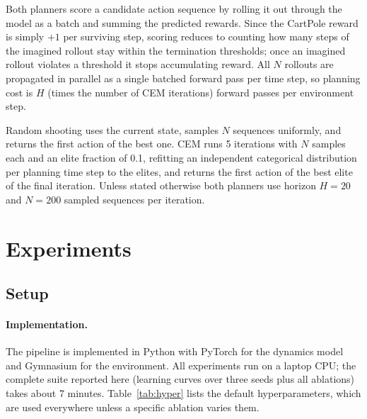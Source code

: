 \documentclass{article}
\begin{document}
Both planners score a candidate action sequence by rolling it out through the model as a batch and summing the predicted rewards. Since the CartPole reward is simply $+1$ per surviving step, scoring reduces to counting how many steps of the imagined rollout stay within the termination thresholds; once an imagined rollout violates a threshold it stops accumulating reward. All $N$ rollouts are propagated in parallel as a single batched forward pass per time step, so planning cost is $H$ (times the number of CEM iterations) forward passes per environment step.

Random shooting uses the current state, samples $N$ sequences uniformly, and returns the first action of the best one. CEM runs 5 iterations with $N$ samples each and an elite fraction of 0.1, refitting an independent categorical distribution per planning time step to the elites, and returns the first action of the best elite of the final iteration. Unless stated otherwise both planners use horizon $H = 20$ and $N = 200$ sampled sequences per iteration.

\section{Experiments}

\subsection{Setup}
\label{sec:setup}

\paragraph{Implementation.} The pipeline is implemented in Python with PyTorch \citep{paszke2019} for the dynamics model and Gymnasium \citep{towers2024} for the environment. All experiments run on a laptop CPU; the complete suite reported here (learning curves over three seeds plus all ablations) takes about 7 minutes. Table~\ref{tab:hyper} lists the default hyperparameters, which are used everywhere unless a specific ablation varies them.
\end{document}
